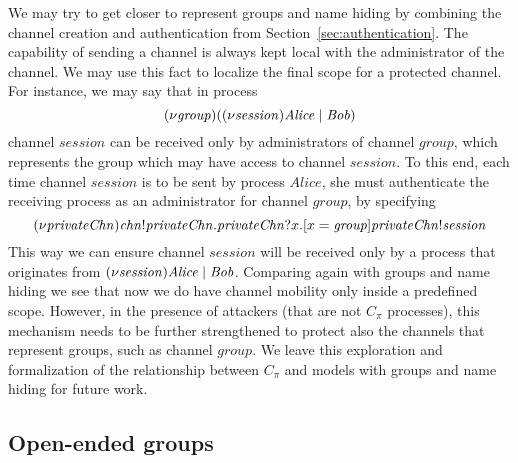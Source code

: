 We may try to get closer to represent groups and name hiding by combining the channel creation and authentication from Section~\ref{sec:authentication}. 
The capability of sending a channel is always kept local with the administrator of the channel. 
We may use this fact to localize the final scope for a protected channel. 
For instance, we may say that in process
\[
(\nu \mathit{group}) ((\nu \mathit{session})\mathit{Alice} \;|\; \mathit{Bob})
\]
channel $\mathit{session}$ can be received only by administrators of channel ${\mathit{group}}$, which represents the group which may have access to channel ${\mathit{session}}$. %
To this end, each time channel $\mathit{session}$ is to be sent by process $\mathit{Alice}$, she must authenticate the receiving process as an administrator for channel ${\mathit{group}}$, by specifying
\[
(\nu \mathit{privateChn}) \mathit{chn}!\mathit{privateChn}. \mathit{privateChn}?x. [ x = \mathit{group} ] \mathit{privateChn}!\mathit{session}
\]
This way we can ensure channel $\mathit{session}$ will be received only by a process that originates from $(\nu \mathit{session})\mathit{Alice} \;|\; \mathit{Bob}$. 
Comparing again with groups and name hiding we see that now we do have channel mobility only inside a predefined scope. However, in the presence of attackers (that are not $C_\pi$ processes), this mechanism needs to be further strengthened to protect also the channels that represent groups, such as channel $\mathit{group}$. We leave this exploration and formalization of the relationship between $C_\pi$ and models with groups and name hiding for future  work.

 

\subsection{Open-ended groups}\label{sec:open-ended-groups}

